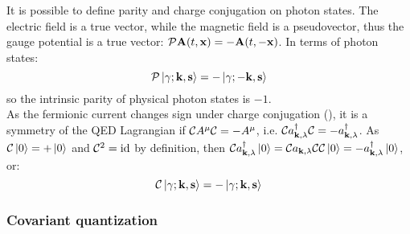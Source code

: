 It is possible to define parity and charge conjugation on photon states. The electric field is a true vector, while the magnetic field is a pseudovector, thus the gauge potential is a true vector: $ \mathcal{P} \mathbf{A}(t,\mathbf{x}) = - \mathbf{A}(t,-\mathbf{x}) $. In terms of photon states:
\begin{equation}
  \mathcal{P} \ket{\gamma ; \mathbf{k}, \mathbf{s}} = - \ket{\gamma ; -\mathbf{k}, \mathbf{s}}
\end{equation}
so the intrinsic parity of physical photon states is $ -1 $. \\
As the fermionic current changes sign under charge conjugation (), it is a symmetry of the QED Lagrangian if $ \mathcal{C} A^\mu \mathcal{C} = - A^\mu $, i.e. $ \mathcal{C} a_{\mathbf{k},\lambda}^\dagger \mathcal{C} = - a_{\mathbf{k},\lambda}^\dagger $. As $ \mathcal{C} \ket{0} = +\ket{0} $ and $ \mathcal{C}^2 = \operatorname{id} $ by definition, then $ \mathcal{C} a_{\mathbf{k},\lambda}^\dagger \ket{0} = \mathcal{C} a_{\mathbf{k},\lambda} \mathcal{C} \mathcal{C} \ket{0} = - a_{\mathbf{k},\lambda}^\dagger \ket{0} $, or:
\begin{equation}
  \mathcal{C} \ket{\gamma ; \mathbf{k} , \mathbf{s}} = - \ket{\gamma ; \mathbf{k} , \mathbf{s}}
\end{equation}

\subsubsection{Covariant quantization}

